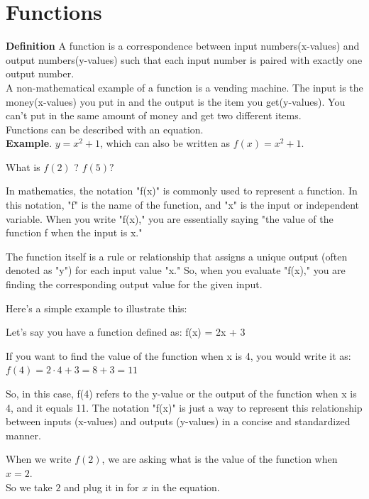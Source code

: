 \section{Functions}
\textbf{Definition} A function is a correspondence between input numbers(x-values) and output numbers(y-values) such that each input number is paired with exactly one output number. \\
A non-mathematical example of a function is a vending machine. The input is the money(x-values) you put in and the output is the item you get(y-values). You can't put in the same amount of money and get two different items. \\

Functions can be described with an equation.
\\
\textbf{Example}. $y = x^2 + 1$, which can also be written as $f(x) = x^2 + 1$. \\
\vspace{4pt}

What is $f(2)$ ? $ f(5) ?$ \\
\vspace{4pt}

In mathematics, the notation "f(x)" is commonly used to represent a function. In this notation, "f" is the name of the function, and "x" is the input or independent variable. When you write "f(x)," you are essentially saying "the value of the function f when the input is x."

The function itself is a rule or relationship that assigns a unique output (often denoted as "y") for each input value "x." So, when you evaluate "f(x)," you are finding the corresponding output value for the given input.

Here's a simple example to illustrate this:

Let's say you have a function defined as:
f(x) = 2x + 3

If you want to find the value of the function when x is 4, you would write it as:
$f(4) = 2 \cdot 4 + 3 = 8 + 3 = 11$

So, in this case, f(4) refers to the y-value or the output of the function when x is 4, and it equals 11. The notation "f(x)" is just a way to represent this relationship between inputs (x-values) and outputs (y-values) in a concise and standardized manner.

When we write $f(2)$, we are asking what is the value of the function when $x = 2$. \\
So we take $2$ and plug it in for $x$ in the equation. \\

